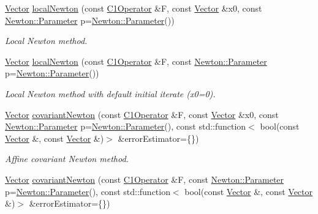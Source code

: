 \begin{DoxyCompactItemize}
\item 
\hyperlink{classSpacy_1_1Vector}{Vector} \hyperlink{group__NewtonGroup_ga70230bc5f8b83684e04685b584967882}{local\+Newton} (const \hyperlink{classSpacy_1_1C1Operator}{C1\+Operator} \&F, const \hyperlink{classSpacy_1_1Vector}{Vector} \&x0, const \hyperlink{structSpacy_1_1Newton_1_1Parameter}{Newton\+::\+Parameter} p=\hyperlink{structSpacy_1_1Newton_1_1Parameter}{Newton\+::\+Parameter}())
\begin{DoxyCompactList}\small\item\em Local Newton method. \end{DoxyCompactList}\item 
\hyperlink{classSpacy_1_1Vector}{Vector} \hyperlink{group__NewtonGroup_gad86d75d93e7d0307c492513c98c48fed}{local\+Newton} (const \hyperlink{classSpacy_1_1C1Operator}{C1\+Operator} \&F, const \hyperlink{structSpacy_1_1Newton_1_1Parameter}{Newton\+::\+Parameter} p=\hyperlink{structSpacy_1_1Newton_1_1Parameter}{Newton\+::\+Parameter}())
\begin{DoxyCompactList}\small\item\em Local Newton method with default initial iterate (x0=0). \end{DoxyCompactList}\item 
\hyperlink{classSpacy_1_1Vector}{Vector} \hyperlink{group__NewtonGroup_gad63424afc4a3a7f48368fd97d6279d56}{covariant\+Newton} (const \hyperlink{classSpacy_1_1C1Operator}{C1\+Operator} \&F, const \hyperlink{classSpacy_1_1Vector}{Vector} \&x0, const \hyperlink{structSpacy_1_1Newton_1_1Parameter}{Newton\+::\+Parameter} p=\hyperlink{structSpacy_1_1Newton_1_1Parameter}{Newton\+::\+Parameter}(), const std\+::function$<$ bool(const \hyperlink{classSpacy_1_1Vector}{Vector} \&, const \hyperlink{classSpacy_1_1Vector}{Vector} \&)$>$ \&error\+Estimator=\{\})
\begin{DoxyCompactList}\small\item\em Affine covariant Newton method. \end{DoxyCompactList}\item 
\hyperlink{classSpacy_1_1Vector}{Vector} \hyperlink{group__NewtonGroup_ga7fd8cb9e0c213a357f5dc1add0ee2eff}{covariant\+Newton} (const \hyperlink{classSpacy_1_1C1Operator}{C1\+Operator} \&F, const \hyperlink{structSpacy_1_1Newton_1_1Parameter}{Newton\+::\+Parameter} p=\hyperlink{structSpacy_1_1Newton_1_1Parameter}{Newton\+::\+Parameter}(), const std\+::function$<$ bool(const \hyperlink{classSpacy_1_1Vector}{Vector} \&, const \hyperlink{classSpacy_1_1Vector}{Vector} \&)$>$ \&error\+Estimator=\{\})

\end{DoxyCompactItemize}

